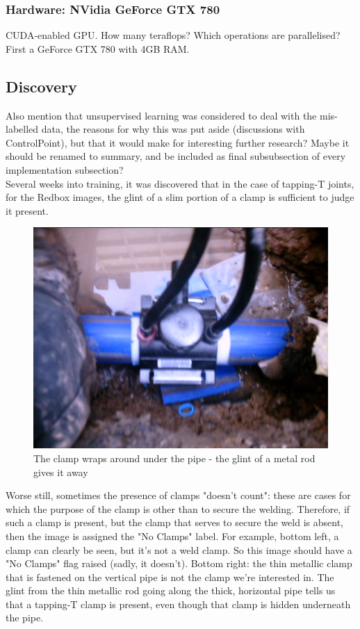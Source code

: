 \documentclass[a4paper,11pt]{article}
\begin{document}
\subsubsection{Hardware: NVidia GeForce GTX 780}

CUDA-enabled GPU. How many teraflops? Which operations are parallelised? 
First a GeForce GTX 780 with 4GB RAM. 


\subsection{Discovery}

Also mention that unsupervised learning was considered to deal with the mis-labelled data, the reasons for why this was put aside (discussions with ControlPoint), but that it would make for interesting further research? Maybe it should be renamed to summary, and be included as final subsubsection of every implementation subsection? \\



Several weeks into training, it was discovered that in the case of tapping-T joints, for the Redbox images, the glint of a slim portion of a clamp is sufficient to judge it present. \\

\begin{figure}[h!]
	\centering
	\includegraphics[width=0.35\linewidth]{images/tapping-T.jpg}
	\caption{The clamp wraps around under the pipe - the glint of a metal rod gives it away}
\end{figure}

Worse still, sometimes the presence of clamps "doesn't count": these are cases for which the purpose of the clamp is other than to secure the welding. Therefore, if such a clamp is present, but the clamp that serves to secure the weld is absent, then the image is assigned the "No Clamps" label. For example, bottom left, a clamp can clearly be seen, but it's not a weld clamp. So this image should have a "No Clamps" flag raised (sadly, it doesn't). Bottom right: the thin metallic clamp that is fastened on the vertical pipe is not the clamp we're interested in. The glint from the thin metallic rod going along the thick, horizontal pipe tells us that a tapping-T clamp is present, even though that clamp is hidden underneath the pipe. 
\end{document}
